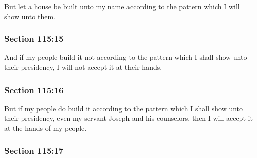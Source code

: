 		But let a house be built unto my name according to the pattern which I will show unto them.


	\subsubsection{Section 115:15} %
		\label{DC115-15}

		And if my people build it not according to the pattern which I shall show unto their presidency, I will not accept it at their hands.


	\subsubsection{Section 115:16} %
		\label{DC115-16}

		But if my people do build it according to the pattern which I shall show unto their presidency, even my servant Joseph and his counselors, then I will accept it at the hands of my people.


	\subsubsection{Section 115:17} %
		\label{DC115-17}


